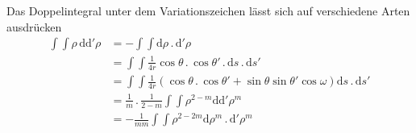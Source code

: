 Das Doppelintegral unter dem Variationszeichen lässt sich auf verschiedene Arten ausdrücken
\[
\begin{aligned}
\int\int\rho\,\mathrm d\mathrm d'\rho&=-\int\int\mathrm d\rho\,.\,\mathrm d'\rho\\
&=\int\int\frac{1}{4r}\cos\theta\,.\,\cos\theta'\,.\,\mathrm ds\,.\,\mathrm ds'\\
&=\int\int\frac{1}{4r}(\cos\theta\,.\,\cos\theta'+\sin\theta\sin\theta'\cos\omega)\mathrm ds\,.\,\mathrm ds'\\
&=\frac{1}{m}\,.\,\frac{1}{2-m}\int\int\rho^{2-m}\mathrm d\mathrm d'\rho^m\\
&=-\frac{1}{mm}\int\int\rho^{2-2m}\mathrm d\rho^m\,.\,\mathrm d'\rho^m
\end{aligned}
\]

